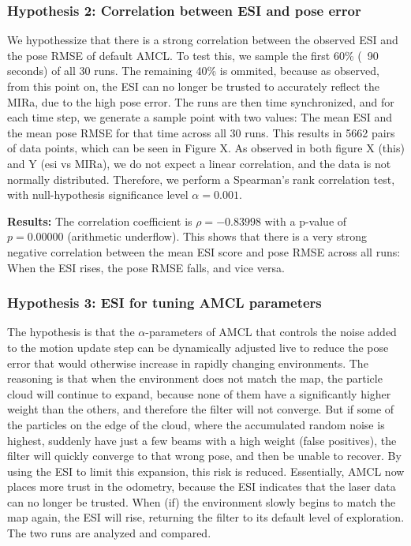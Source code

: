 \subsubsection{\textbf{Hypothesis 2: Correlation between ESI and pose error}}
We hypothessize that there is a strong correlation between the observed ESI and the pose RMSE of default AMCL. 
To test this, we sample the first 60\% (~90 seconds) of all 30 runs. The remaining 40\% is ommited, because as observed, from this point on, 
the ESI can no longer be trusted to accurately reflect the MIRa, due to the high pose error. 
The runs are then time synchronized, and for each time step, we generate a sample point with two values: The mean ESI and the mean pose RMSE for that time
across all 30 runs. This results in 5662 pairs of data points, which can be seen in Figure X. As observed in both figure X (this) and Y (esi vs MIRa), 
we do not expect a linear correlation, and the data is not normally distributed. 
Therefore, we perform a Spearman's rank correlation test, with null-hypothesis significance level $\alpha=0.001$.

\textbf{Results:} The correlation coefficient is $\rho = -0.83998$ with a p-value of $p=0.00000$ (arithmetic underflow). 
This shows that there is a very strong negative correlation between the mean ESI score and pose RMSE across all runs: 
When the ESI rises, the pose RMSE falls, and vice versa.


\subsubsection{\textbf{Hypothesis 3: ESI for tuning AMCL parameters}} 
The hypothesis is that the $\alpha$-parameters of AMCL that controls the noise added to the motion update step can be dynamically adjusted live
to reduce the pose error that would otherwise increase in rapidly changing environments. The reasoning is that when the environment does not match the map, 
the particle cloud will continue to expand, because none of them have a significantly higher weight than the others, and therefore the filter will not converge. 
But if some of the particles on the edge of the cloud, where the accumulated random noise is highest, suddenly have just a few beams with a high weight 
(false positives), the filter will quickly converge to that wrong pose, and then be unable to recover. By using the ESI to limit this expansion, 
this risk is reduced. Essentially, AMCL now places more trust in the odometry, because the ESI indicates that the laser data can no longer be trusted. 
When (if) the environment slowly begins to match the map again, the ESI will rise, returning the filter to its default level of exploration. 
The two runs are analyzed and compared. 

